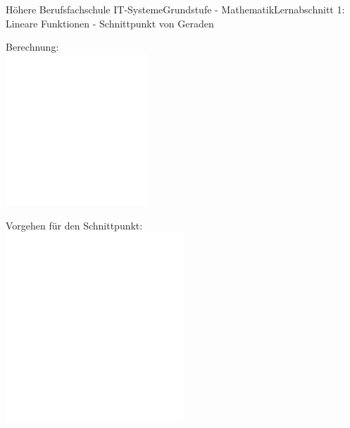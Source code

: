 \documentclass[oneside,openany,headings=optiontotoc,11pt,numbers=noenddot]{scrreprt}
\begin{document}
\begin{worksheet}{Höhere Berufsfachschule IT-Systeme}{Grundstufe - Mathematik}{Lernabschnitt 1: Lineare Funktionen - Schnittpunkt von Geraden}
\begin{framed}
			\noindent
			\small{\color{codegray}Berechnung:}\\
			\includegraphics[width=0.4\textwidth]{../../empty.jpg}
		\end{framed}
		\begin{framed}
			\noindent
			\small{\color{codegray}Vorgehen für den Schnittpunkt:}\\
			\includegraphics[width=0.5\textwidth]{../../empty.jpg}
		\end{framed}
	\end{worksheet}
\end{document}
